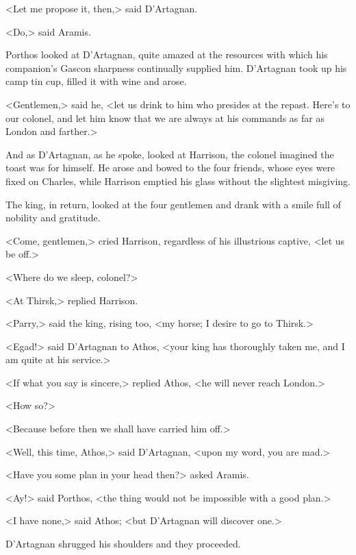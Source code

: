 <Let me propose it, then,> said D'Artagnan.

<Do,> said Aramis.

Porthos looked at D'Artagnan, quite amazed at the resources with which his companion's Gascon sharpness continually supplied him. D'Artagnan took up his camp tin cup, filled it with wine and arose.

<Gentlemen,> said he, <let us drink to him who presides at the repast. Here's to our colonel, and let him know that we are always at his commands as far as London and farther.>

And as D'Artagnan, as he spoke, looked at Harrison, the colonel imagined the toast was for himself. He arose and bowed to the four friends, whose eyes were fixed on Charles, while Harrison emptied his glass without the slightest misgiving.

The king, in return, looked at the four gentlemen and drank with a smile full of nobility and gratitude.

<Come, gentlemen,> cried Harrison, regardless of his illustrious captive, <let us be off.>

<Where do we sleep, colonel?>

<At Thirsk,> replied Harrison.

<Parry,> said the king, rising too, <my horse; I desire to go to Thirsk.>

<Egad!> said D'Artagnan to Athos, <your king has thoroughly taken me, and I am quite at his service.>

<If what you say is sincere,> replied Athos, <he will never reach London.>

<How so?>

<Because before then we shall have carried him off.>

<Well, this time, Athos,> said D'Artagnan, <upon my word, you are mad.>

<Have you some plan in your head then?> asked Aramis.

<Ay!> said Porthos, <the thing would not be impossible with a good plan.>

<I have none,> said Athos; <but D'Artagnan will discover one.>

D'Artagnan shrugged his shoulders and they proceeded. 